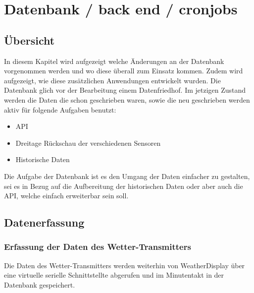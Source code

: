 \section{Datenbank / back end / cronjobs}

\subsection{Übersicht}

In diesem Kapitel wird aufgezeigt welche Änderungen an der Datenbank vorgenommen werden und wo diese überall zum Einsatz kommen. Zudem wird aufgezeigt, wie diese zusätzlichen Anwendungen entwickelt wurden. Die Datenbank glich vor der Bearbeitung einem Datenfriedhof. Im jetzigen Zustand werden die Daten die schon geschrieben waren, sowie die neu geschrieben werden aktiv für folgende Aufgaben benutzt:\\
\begin{itemize}
\item API
\item Dreitage Rückschau der verschiedenen Sensoren
\item Historische Daten
\end{itemize}

Die Aufgabe der Datenbank ist es den Umgang der Daten einfacher zu gestalten, sei es in Bezug auf die Aufbereitung der historischen Daten oder aber auch die API, welche einfach erweiterbar sein soll.



\subsection{Datenerfassung}
\subsubsection{Erfassung der Daten des Wetter-Transmitters}
Die Daten des Wetter-Transmitters werden weiterhin von WeatherDisplay über eine virtuelle serielle Schnittstellte abgerufen und im Minutentakt in der Datenbank gespeichert.
\newline
{}\newline

